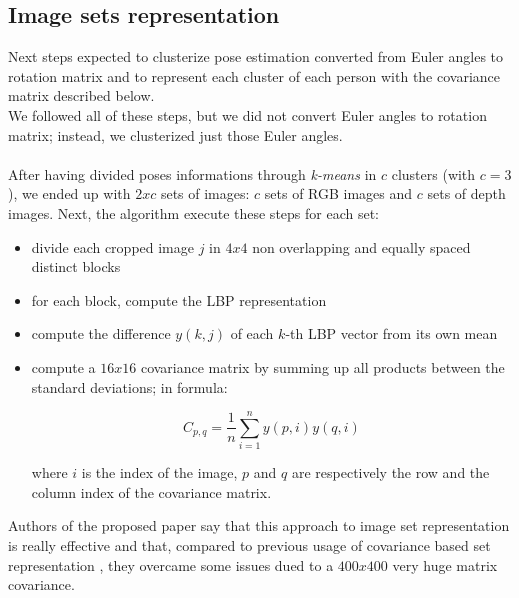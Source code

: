 \documentclass[twoside,twocolumn]{article}
\begin{document}
\subsection{Image sets representation}
Next steps expected to clusterize pose estimation converted from Euler angles to
rotation matrix and to represent each cluster of each person with the covariance
matrix described below.
\\
We followed all of these steps, but we did not convert Euler angles to rotation
matrix; instead, we clusterized just those Euler angles.
\\
\\
After having divided poses informations through \textit{k-means} in $c$
clusters (with $c=3$), we ended up with $2xc$ sets of images: $c$ sets of RGB
images and $c$ sets of depth images. Next, the algorithm execute these steps
for each set:
\begin{itemize}
	\item divide each cropped image $j$ in $4x4$ non overlapping and equally
		spaced distinct blocks
	\item for each block, compute the LBP representation
	\item compute the difference $y(k, j)$ of each $k$-th LBP vector from
		its own mean
	\item compute a $16x16$ covariance matrix by summing up all products
		between the standard deviations; in formula:

		$$
		C_{p, q} = \frac{1}{n} \sum_{i=1}^n y(p, i)y(q, i)
		$$

		where $i$ is the index of the image, $p$ and $q$ are
		respectively the row and the column index of the covariance
		matrix.
\end{itemize}
Authors of the proposed paper say that this approach to image set representation
is really effective and that, compared to previous usage of covariance based set
representation \citep{Dai2012}, they overcame some issues dued to a $400x400$
very huge matrix covariance.
\end{document}
